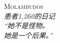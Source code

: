 \cleardoublepage
\thispagestyle{empty}
\vspace*{\fill}
\begin{center}
{\scshape\Large Molambudos}\\[0.4em]
{\small\itshape 患者1,260的日记}\\[6em]

{\large\itshape
“她不是怪物。\\[0.5em]
她是一个后果。”}
\end{center}
\vspace*{\fill}
\clearpage
